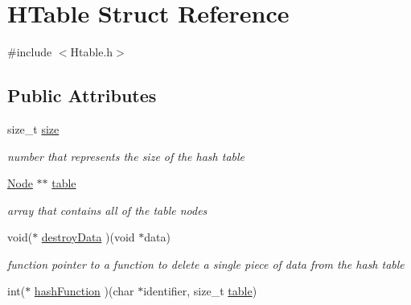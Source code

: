 \hypertarget{struct_h_table}{}\section{H\+Table Struct Reference}
\label{struct_h_table}


{\ttfamily \#include $<$Htable.\+h$>$}

\subsection*{Public Attributes}
\begin{DoxyCompactItemize}
\item 
\mbox{\label{struct_h_table_a6ede6f5f1f743298425e0832cfd24a4a}} 
size\+\_\+t \mbox{\hyperlink{struct_h_table_a6ede6f5f1f743298425e0832cfd24a4a}{size}}
\begin{DoxyCompactList}\small\item\em number that represents the size of the hash table \end{DoxyCompactList}\item 
\mbox{\label{struct_h_table_ad8f77b5519a173524eee87a5ebb380a0}} 
\mbox{\hyperlink{struct_node}{Node}} $\ast$$\ast$ \mbox{\hyperlink{struct_h_table_ad8f77b5519a173524eee87a5ebb380a0}{table}}
\begin{DoxyCompactList}\small\item\em array that contains all of the table nodes \end{DoxyCompactList}\item 
\mbox{\label{struct_h_table_a05b3109f3bbfa3fd4b3e55c0bbd29b8a}} 
void($\ast$ \mbox{\hyperlink{struct_h_table_a05b3109f3bbfa3fd4b3e55c0bbd29b8a}{destroy\+Data}} )(void $\ast$data)
\begin{DoxyCompactList}\small\item\em function pointer to a function to delete a single piece of data from the hash table \end{DoxyCompactList}\item 
\mbox{\label{struct_h_table_abfbae692eae01c5f4d23052abd611b67}} 
int($\ast$ \mbox{\hyperlink{struct_h_table_abfbae692eae01c5f4d23052abd611b67}{hash\+Function}} )(char $\ast$identifier, size\+\_\+t \mbox{\hyperlink{struct_h_table_ad8f77b5519a173524eee87a5ebb380a0}{table}})
$$
\end{DoxyCompactItemize}
